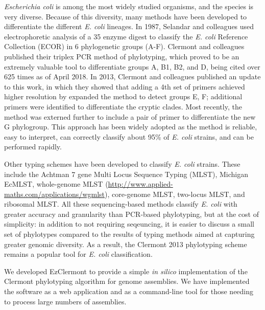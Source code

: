 \textit{Escherichia coli} is among the most widely studied organisms, and the species is very diverse\cite{Lukjancenko2010, Selander1987}.
Because of this diversity, many methods have been developed to differentiate the different  \textit{E. coli} lineages.  In 1987, Selandar  and colleagues used electrophoretic analysis of a 35 enzyme digest to classify the \textit{E. coli} Reference Collection (ECOR) in 6 phylogenetic groups (A-F)\cite{Selander1987}.  Clermont and colleagues published their triplex PCR method\cite{Clermont2000} of phylotyping, which proved to be an extremely valuable tool to differentiate groups A, B1, B2, and D, being cited over 625 times as of April 2018.  In 2013, Clermont and colleagues published an update to this work\cite{Clermont2013}, in which they showed that adding a 4th set of primers achieved higher resolution by expanded the method to detect groups E, F; additional primers were identified to differentiate the cryptic clades.  Most recently, the method was externed further to include a pair of primer to differentiate the new G phylogroup. This approach has been widely adopted as the method is reliable, easy to interpret, can correctly classify about 95\% of \textit{E. coli} strains, and can be performed rapidly.

Other typing schemes have been developed to classify \textit{E. coli} strains. These include the Achtman 7 gene Multi Locus Sequence Typing (MLST)\cite{Achtman2012, Alikhan2018}, Michigan EcMLST\cite{Qi2004}, whole-genome MLST (\url{http://www.applied-maths.com/applications/wgmlst}), core-genome MLST\cite{DeBeen2015}, two-locus MLST\cite{Weissman2012}, and ribosomal MLST\cite{Jolley2012}. All these sequencing-based methods classify \textit{E. coli} with greater accuracy and granularity than PCR-based phylotyping, but at the cost of simplicity: in addition to not requiring seqeuncing, it is easier to discuss a small set of phylotypes compared to the results of typing methods aimed at capturing greater genomic diversity. As a result, the Clermont 2013 phylotyping scheme remains a popular tool for \textit{E. coli} classification.

We developed EzClermont to provide a simple \textit{in silico} implementation of the Clermont phylotyping algorithm for genome assemblies. We have implemented the software as a web application and as a command-line tool for those needing to process large numbers of assemblies.
